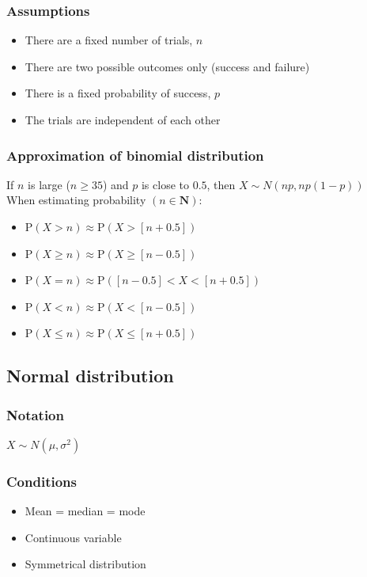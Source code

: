 \documentclass[A4paper, 11pt]{article}
\begin{document}
	\subsubsection{Assumptions}
	\begin{itemize}
		\item There are a fixed number of trials, $n$
		\item There are two possible outcomes only (success and failure)
		\item There is a fixed probability of success, $p$
		\item The trials are independent of each other
	\end{itemize}
	\subsubsection{Approximation of binomial distribution}
	If $n$ is large ($n\geq35$) and $p$ is close to $0.5$, then $X \sim N(np, np(1-p))$\\
	When estimating probability $(n\in \textbf{N})$:
	\begin{itemize}
		\item $\text{P}(X>n)\approx \text{P}(X>[n+0.5])$
		\item $\text{P}(X\geq n)\approx \text{P}(X\geq [n-0.5])$
		\item $\text{P}(X=n)\approx \text{P}([n-0.5]<X<[n+0.5])$
		\item $\text{P}(X<n)\approx \text{P}(X<[n-0.5])$
		\item $\text{P}(X \leq n)\approx \text{P}(X\leq [n+0.5])$
	\end{itemize}
	
	\subsection{Normal distribution}
	\subsubsection{Notation}
	$X \sim N(\mu,\sigma^2)$
	\subsubsection{Conditions}
	\begin{itemize}
		\item Mean = median = mode
		\item Continuous variable
		\item Symmetrical distribution
	\end{itemize}
\end{document}
